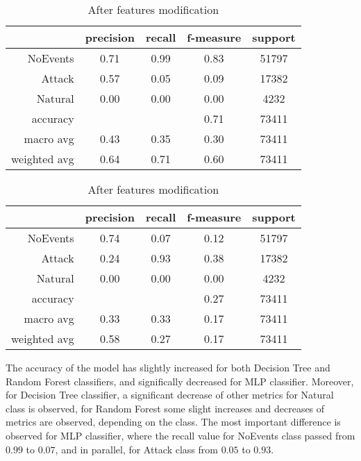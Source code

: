 \begin{table}[H]
    \centering
    \footnotesize
    \caption{Features modification results for MLP classifier} \label{tab:fm_mlp}
    \begin{subtable}[t]{.5\linewidth}
        \centering
        \caption{Before features modification} 
        \begin{tabular}{rcccc}\toprule
            & precision    &recall & f-measure  & support \\\midrule
            NoEvents   &    0.71 &     0.99 &     0.83&    51797\\
            Attack     &  0.57   &   0.05   &   0.09  &   17382\\
           Natural     &  0.00   &   0.00   &   0.00  &    4232\\    
          accuracy     &         &          &   0.71  &   73411\\
         macro avg     &  0.43   &   0.35   &   0.30  &   73411\\
      weighted avg     &  0.64   &   0.71   &   0.60  &   73411\\ \bottomrule
        \end{tabular}
    \end{subtable}%
    \begin{subtable}[t]{.5\linewidth}
        \centering
        \caption{After features modification}
        \begin{tabular}{rcccc}\toprule
            &precision   & recall & f-measure &  support  \\\midrule
            NoEvents   &    0.74  &    0.07 &     0.12 &  51797\\
            Attack     &  0.24    &  0.93   &   0.38   &  17382\\
           Natural     &  0.00    &  0.00   &   0.00   &   4232\\   
          accuracy     &          &         &   0.27   &  73411\\
         macro avg     &  0.33    &  0.33   &   0.17   &  73411\\
      weighted avg     &  0.58    &  0.27   &   0.17   &  73411\\    \bottomrule   
        \end{tabular}
    \end{subtable}
\end{table}

The accuracy of the model has slightly increased for both Decision Tree and Random Forest classifiers, and significally decreased for MLP classifier. Moreover, for Decision Tree classifier, a significant decrease of other metrics for Natural class is observed, for Random Forest some slight increases and decreases of metrics are observed, depending on the class. The most important difference is observed for MLP classifier, where the recall value for NoEvents class passed from $0.99$ to $0.07$, and in parallel, for Attack class from $0.05$ to $0.93$.

